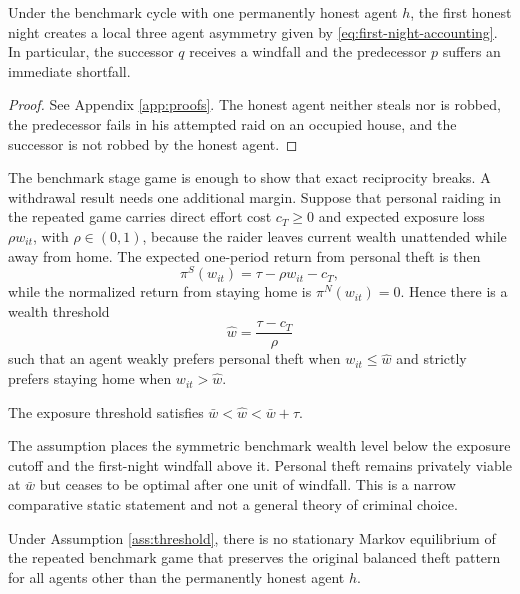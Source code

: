 \begin{lemma}
\label{lem:first-night}
Under the benchmark cycle with one permanently honest agent $h$, the first honest night creates a local three agent asymmetry given by \eqref{eq:first-night-accounting}. In particular, the successor $q$ receives a windfall and the predecessor $p$ suffers an immediate shortfall.
\end{lemma}

\begin{proof}
See Appendix \ref{app:proofs}. The honest agent neither steals nor is robbed, the predecessor fails in his attempted raid on an occupied house, and the successor is not robbed by the honest agent.
\end{proof}

The benchmark stage game is enough to show that exact reciprocity breaks. A withdrawal result needs one additional margin. Suppose that personal raiding in the repeated game carries direct effort cost $c_T \ge 0$ and expected exposure loss $\rho w_{it}$, with $\rho \in (0,1)$, because the raider leaves current wealth unattended while away from home. The expected one-period return from personal theft is then
\begin{equation}
\pi^{S}(w_{it}) = \tau - \rho w_{it} - c_T,
\label{eq:self-theft-threshold}
\end{equation}
while the normalized return from staying home is $\pi^{N}(w_{it}) = 0$. Hence there is a wealth threshold
\begin{equation}
\widehat{w} = \frac{\tau - c_T}{\rho}
\label{eq:threshold}
\end{equation}
such that an agent weakly prefers personal theft when $w_{it} \le \widehat{w}$ and strictly prefers staying home when $w_{it} > \widehat{w}$.

\begin{assumption}
\label{ass:threshold}
The exposure threshold satisfies $\bar{w} < \widehat{w} < \bar{w} + \tau$.
\end{assumption}

The assumption places the symmetric benchmark wealth level below the exposure cutoff and the first-night windfall above it. Personal theft remains privately viable at $\bar{w}$ but ceases to be optimal after one unit of windfall. This is a narrow comparative static statement and not a general theory of criminal choice.

\begin{theorem}
\label{thm:no-stationary-one-honest}
Under Assumption \ref{ass:threshold}, there is no stationary Markov equilibrium of the repeated benchmark game that preserves the original balanced theft pattern for all agents other than the permanently honest agent $h$.
\end{theorem}

